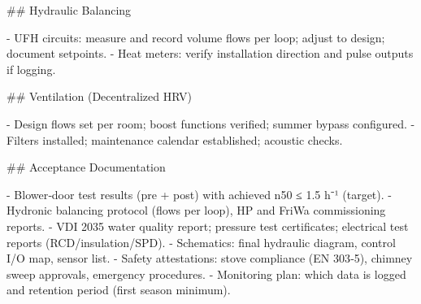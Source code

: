 \documentclass[11pt,oneside]{report}
\begin{document}
\begin{markdown}
## Hydraulic Balancing

- UFH circuits: measure and record volume flows per loop; adjust to design; document setpoints.
- Heat meters: verify installation direction and pulse outputs if logging.

## Ventilation (Decentralized HRV)

- Design flows set per room; boost functions verified; summer bypass configured.
- Filters installed; maintenance calendar established; acoustic checks.

## Acceptance Documentation

- Blower‑door test results (pre + post) with achieved n50 ≤ 1.5 h⁻¹ (target).
- Hydronic balancing protocol (flows per loop), HP and FriWa commissioning reports.
- VDI 2035 water quality report; pressure test certificates; electrical test reports (RCD/insulation/SPD).
- Schematics: final hydraulic diagram, control I/O map, sensor list.
- Safety attestations: stove compliance (EN 303‑5), chimney sweep approvals, emergency procedures.
- Monitoring plan: which data is logged and retention period (first season minimum).
\end{markdown}
\end{document}
